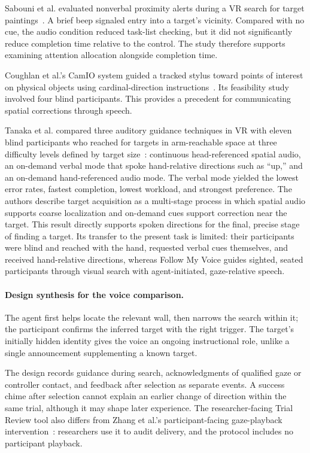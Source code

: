 Sabouni et al. evaluated nonverbal proximity alerts during a VR search for target paintings~\cite{sabouni2025guidance}. A brief beep signaled entry into a target's vicinity. Compared with no cue, the audio condition reduced task-list checking, but it did not significantly reduce completion time relative to the control. The study therefore supports examining attention allocation alongside completion time.

Coughlan et al.'s CamIO system guided a tracked stylus toward points of interest on physical objects using cardinal-direction instructions~\cite{coughlan2020spatial}. Its feasibility study involved four blind participants. This provides a precedent for communicating spatial corrections through speech.

Tanaka et al. compared three auditory guidance techniques in VR with eleven blind participants who reached for targets in arm-reachable space at three difficulty levels defined by target size~\cite{tanaka2026coarse}: continuous head-referenced spatial audio, an on-demand verbal mode that spoke hand-relative directions such as ``up,'' and an on-demand hand-referenced audio mode. The verbal mode yielded the lowest error rates, fastest completion, lowest workload, and strongest preference. The authors describe target acquisition as a multi-stage process in which spatial audio supports coarse localization and on-demand cues support correction near the target. This result directly supports spoken directions for the final, precise stage of finding a target. Its transfer to the present task is limited: their participants were blind and reached with the hand, requested verbal cues themselves, and received hand-relative directions, whereas Follow My Voice guides sighted, seated participants through visual search with agent-initiated, gaze-relative speech.

\paragraph{Design synthesis for the voice comparison.}
The agent first helps locate the relevant wall, then narrows the search within it; the participant confirms the inferred target with the right trigger. The target's initially hidden identity gives the voice an ongoing instructional role, unlike a single announcement supplementing a known target.

The design records guidance during search, acknowledgments of qualified gaze or controller contact, and feedback after selection as separate events. A success chime after selection cannot explain an earlier change of direction within the same trial, although it may shape later experience. The researcher-facing Trial Review tool also differs from Zhang et al.'s participant-facing gaze-playback intervention~\cite{zhang2023seehear}: researchers use it to audit delivery, and the protocol includes no participant playback.

